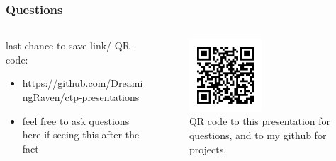 \documentclass[aspectratio=169]{beamer}
\begin{document}
  \begin{frame}
    \frametitle{Questions}
    \begin{columns}
      \begin{column}{0.5\textwidth}
        last chance to save link/ QR-code:
        \begin{itemize}
          \item https://github.com/DreamingRaven/ctp-presentations
          \item feel free to ask questions here if seeing this after the fact
        \end{itemize}
      \end{column}
      \begin{column}{0.5\textwidth}
        \begin{figure}[th!]
          \centering
          \includegraphics[width=0.5\textwidth]{qrcode.png}
          \caption{QR code to this presentation for questions, and to my github for projects. \autocite{repository}}
          \label{fig:qr}
        \end{figure}
      \end{column}
    \end{columns}
  \end{frame}
\end{document}
